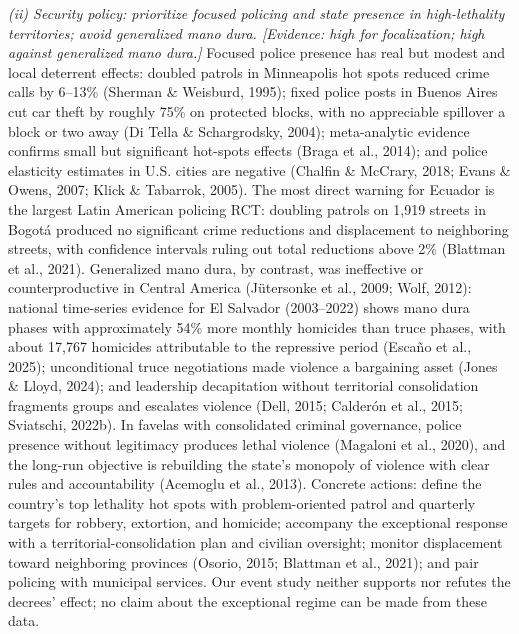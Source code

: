 \textit{(ii) Security policy: prioritize focused policing and state presence in high-lethality territories; avoid generalized mano dura. [Evidence: high for focalization; high against generalized mano dura.]} Focused police presence has real but modest and local deterrent effects: doubled patrols in Minneapolis hot spots reduced crime calls by 6--13\% (Sherman \& Weisburd, 1995); fixed police posts in Buenos Aires cut car theft by roughly 75\% on protected blocks, with no appreciable spillover a block or two away (Di Tella \& Schargrodsky, 2004); meta-analytic evidence confirms small but significant hot-spots effects (Braga et al., 2014); and police elasticity estimates in U.S. cities are negative (Chalfin \& McCrary, 2018; Evans \& Owens, 2007; Klick \& Tabarrok, 2005). The most direct warning for Ecuador is the largest Latin American policing RCT: doubling patrols on 1,919 streets in Bogotá produced no significant crime reductions and displacement to neighboring streets, with confidence intervals ruling out total reductions above 2\% (Blattman et al., 2021). Generalized mano dura, by contrast, was ineffective or counterproductive in Central America (Jütersonke et al., 2009; Wolf, 2012): national time-series evidence for El Salvador (2003--2022) shows mano dura phases with approximately 54\% more monthly homicides than truce phases, with about 17,767 homicides attributable to the repressive period (Escaño et al., 2025); unconditional truce negotiations made violence a bargaining asset (Jones \& Lloyd, 2024); and leadership decapitation without territorial consolidation fragments groups and escalates violence (Dell, 2015; Calderón et al., 2015; Sviatschi, 2022b). In favelas with consolidated criminal governance, police presence without legitimacy produces lethal violence (Magaloni et al., 2020), and the long-run objective is rebuilding the state's monopoly of violence with clear rules and accountability (Acemoglu et al., 2013). Concrete actions: define the country's top lethality hot spots with problem-oriented patrol and quarterly targets for robbery, extortion, and homicide; accompany the exceptional response with a territorial-consolidation plan and civilian oversight; monitor displacement toward neighboring provinces (Osorio, 2015; Blattman et al., 2021); and pair policing with municipal services. Our event study neither supports nor refutes the decrees' effect; no claim about the exceptional regime can be made from these data.


